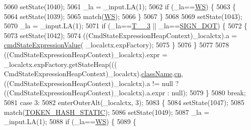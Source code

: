 \begin{DoxyCode}
5060         setState(1040);
5061         \_la = \_input.LA(1);
5062         \textcolor{keywordflow}{if} (\_la==\hyperlink{classgov_1_1nasa_1_1jpf_1_1inspector_1_1server_1_1expression_1_1parser_1_1_expression_grammar_parser_ace44714ae633c7b14794cc5a24d9ebf3}{WS}) \{
5063           \{
5064           setState(1039);
5065           match(\hyperlink{classgov_1_1nasa_1_1jpf_1_1inspector_1_1server_1_1expression_1_1parser_1_1_expression_grammar_parser_ace44714ae633c7b14794cc5a24d9ebf3}{WS});
5066           \}
5067         \}
5068 
5069         setState(1043);
5070         \_la = \_input.LA(1);
5071         \textcolor{keywordflow}{if} (\_la==\hyperlink{classgov_1_1nasa_1_1jpf_1_1inspector_1_1server_1_1expression_1_1parser_1_1_expression_grammar_parser_a68f9589dcc3fc777455467ff010385ea}{T\_\_3} || \_la==\hyperlink{classgov_1_1nasa_1_1jpf_1_1inspector_1_1server_1_1expression_1_1parser_1_1_expression_grammar_parser_af578d1cac8553bcf6f52608a4e9125f1}{SIGN\_DOT}) \{
5072           \{
5073           setState(1042);
5074           ((CmdStateExpressionHeapContext)\_localctx).a = \hyperlink{classgov_1_1nasa_1_1jpf_1_1inspector_1_1server_1_1expression_1_1parser_1_1_expression_grammar_parser_a9c38888905b31e514c2e4a695b8b2be6}{cmdStateExpressionValue}(
      \_localctx.expFactory);
5075           \}
5076         \}
5077 
5078          ((CmdStateExpressionHeapContext)\_localctx).expr =  \_localctx.expFactory.getStateHeap(((
      CmdStateExpressionHeapContext)\_localctx).\hyperlink{classgov_1_1nasa_1_1jpf_1_1inspector_1_1server_1_1expression_1_1parser_1_1_expression_grammar_parser_aafe03b251eef204ae911768faa5fd862}{className}.\hyperlink{classgov_1_1nasa_1_1jpf_1_1inspector_1_1server_1_1expression_1_1parser_1_1_expression_grammar_parser_1_1_class_name_context_adfd3eff7fa59de106f32ddb5f19117e8}{cn},   ((CmdStateExpressionHeapContext)\_localctx).a != 
      null ? ((CmdStateExpressionHeapContext)\_localctx).a.expr : null); 
5079         \}
5080         \textcolor{keywordflow}{break};
5081       \textcolor{keywordflow}{case} 3:
5082         enterOuterAlt(\_localctx, 3);
5083         \{
5084         setState(1047);
5085         match(\hyperlink{classgov_1_1nasa_1_1jpf_1_1inspector_1_1server_1_1expression_1_1parser_1_1_expression_grammar_parser_a291146c24b193dc8ab6fbe0b40432881}{TOKEN\_HASH\_STATIC});
5086         setState(1049);
5087         \_la = \_input.LA(1);
5088         \textcolor{keywordflow}{if} (\_la==\hyperlink{classgov_1_1nasa_1_1jpf_1_1inspector_1_1server_1_1expression_1_1parser_1_1_expression_grammar_parser_ace44714ae633c7b14794cc5a24d9ebf3}{WS}) \{
5089           \{

\end{DoxyCode}
